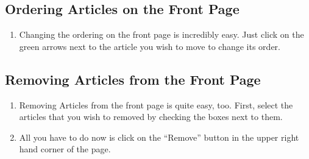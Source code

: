 \documentclass{howto}
\begin{document}
\subsection{Ordering Articles on the Front Page}

\begin{enumerate}
\item{Changing the ordering on the front page is incredibly easy.  Just click on the green arrows next to the article you wish to move to change its order.}
\end{enumerate}

\subsection{Removing Articles from the Front Page}

\begin{enumerate}

\item{Removing Articles from the front page is quite easy, too.  First, select the articles that you wish to removed by checking the boxes next to them.}

\item{All you have to do now is click on the “Remove” button in the upper right hand corner of the page.}

\end{enumerate}
\end{document}
